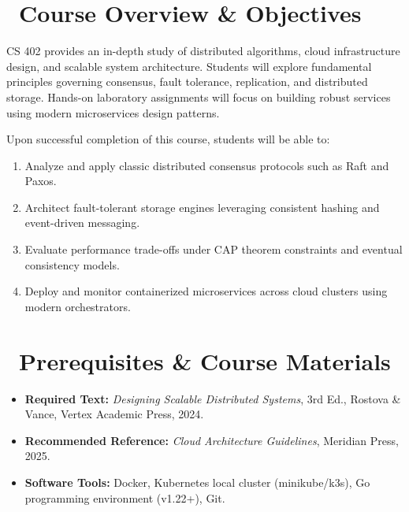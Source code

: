 \documentclass[11pt, a4paper]{article}
\begin{document}
\vspace{1em}

\section*{\faBook\ Course Overview \& Objectives}
CS 402 provides an in-depth study of distributed algorithms, cloud infrastructure design, and scalable system architecture. Students will explore fundamental principles governing consensus, fault tolerance, replication, and distributed storage. Hands-on laboratory assignments will focus on building robust services using modern microservices design patterns.

Upon successful completion of this course, students will be able to:
\begin{enumerate}[label=\textcolor{TealSecondary}{\bfseries \arabic*.}, leftmargin=2em]
  \item Analyze and apply classic distributed consensus protocols such as Raft and Paxos.
  \item Architect fault-tolerant storage engines leveraging consistent hashing and event-driven messaging.
  \item Evaluate performance trade-offs under CAP theorem constraints and eventual consistency models.
  \item Deploy and monitor containerized microservices across cloud clusters using modern orchestrators.
\end{enumerate}

\vspace{0.5em}

\section*{\faFile\ Prerequisites \& Course Materials}
\begin{itemize}[label=\textcolor{NavyPrimary}{\small\faCheckCircle}, leftmargin=1.5em]
  \item \textbf{Required Text:} \emph{Designing Scalable Distributed Systems}, 3rd Ed., Rostova \& Vance, Vertex Academic Press, 2024.
  \item \textbf{Recommended Reference:} \emph{Cloud Architecture Guidelines}, Meridian Press, 2025.
  \item \textbf{Software Tools:} Docker, Kubernetes local cluster (minikube/k3s), Go programming environment (v1.22+), Git.
\end{itemize}
\end{document}
